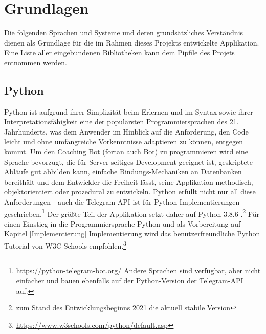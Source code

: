 \chapter{Grundlagen} \label{Grundlagen}
Die folgenden Sprachen und Systeme und deren grundsätzliches Verständnis dienen als Grundlage für die im Rahmen dieses Projekts entwickelte Applikation. Eine Liste aller eingebundenen Bibliotheken kann dem Pipfile des Projets entnommen werden. 


    \section{Python}
        Python ist aufgrund ihrer Simplizität beim Erlernen und im Syntax sowie ihrer Interpretationsfähigkeit eine der populärsten Programmiersprachen des 21. Jahrhunderts, was dem Anwender im Hinblick auf die Anforderung, den Code leicht und ohne umfangreiche Vorkenntnisse adaptieren zu können, entgegen kommt. Um den Coaching Bot (fortan auch \glqq Bot\grqq) zu programmieren wird eine Sprache bevorzugt, die für Server-seitiges Development geeignet ist, geskriptete Abläufe gut abbilden kann, einfache Bindungs-Mechaniken an Datenbanken bereithält und dem Entwickler die Freiheit lässt, seine Applikation methodisch, objektorientiert oder prozedural zu entwickeln.\cite{python} Python erfüllt nicht nur all diese Anforderungen - auch die Telegram-API ist für Python-Implementierungen geschrieben.\footnote{\url{https://python-telegram-bot.org/} Andere Sprachen sind verfügbar, aber nicht einfacher und bauen ebenfalls auf der Python-Version der Telegram-API auf.}
        Der größte Teil der Applikation setzt daher auf Python 3.8.6 \cite{python3.8.6}.\footnote{zum Stand des Entwicklungsbeginns 2021 die aktuell stabile Version} 
        Für einen Einstieg in die Programmiersprache Python und als Vorbereitung auf Kapitel \ref{Implementierung} Implementierung wird das benutzerfreundliche Python Tutorial von W3C-Schools empfohlen.\footnote{\url{https://www.w3schools.com/python/default.asp}}

